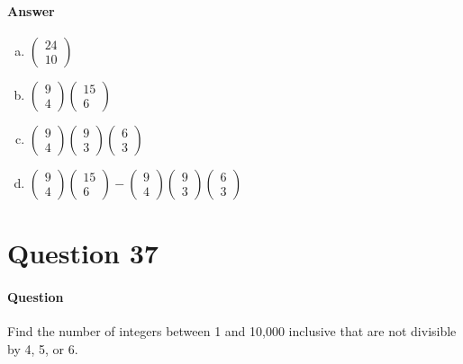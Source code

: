 \documentclass{article}
\begin{document}
\paragraph{Answer}
\begin{enumerate}[(a)]
\item $ \begin{pmatrix} 24 \\ 10 \end{pmatrix} $
\item $ \begin{pmatrix} 9 \\ 4 \end{pmatrix} \begin{pmatrix} 15 \\ 6 \end{pmatrix}$
\item $ \begin{pmatrix} 9 \\ 4 \end{pmatrix} \begin{pmatrix} 9 \\ 3 \end{pmatrix} \begin{pmatrix} 6 \\ 3 \end{pmatrix}$
\item $ \begin{pmatrix} 9 \\ 4 \end{pmatrix} \begin{pmatrix} 15 \\ 6 \end{pmatrix} - \begin{pmatrix} 9 \\ 4 \end{pmatrix} \begin{pmatrix} 9 \\ 3 \end{pmatrix} \begin{pmatrix} 6 \\ 3 \end{pmatrix}$
\end{enumerate}
\section{Question 37}
\paragraph{Question}
Find the number of integers between 1 and 10,000 inclusive that are not divisible by 4, 5, or 6.
\end{document}
